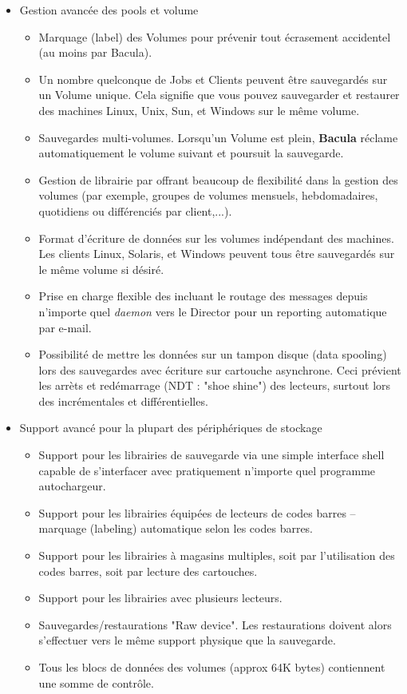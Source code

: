 \begin{itemize}
\item Gestion avanc\'ee des pools et volume 
  \begin{itemize}
    \item Marquage (label) des Volumes pour pr\'evenir tout \'ecrasement
    accidentel (au moins par Bacula).  
    \item Un nombre quelconque de Jobs et Clients peuvent \^etre sauvegard\'es sur
    un Volume unique.  Cela signifie que vous pouvez sauvegarder et restaurer des
    machines Linux,  Unix, Sun, et Windows sur le m\^eme volume.  
    \item Sauvegardes multi-volumes. Lorsqu'un Volume est plein, {\bf Bacula} 
    r\'eclame automatiquement le volume suivant et poursuit la sauvegarde.  
    \item Gestion de librairie par 
    offrant  beaucoup de
   flexibilit\'e dans la gestion des volumes (par exemple, groupes de volumes mensuels, 
   hebdomadaires, quotidiens ou diff\'erenci\'es par client,...).  
   \item Format d'\'ecriture de donn\'ees sur les volumes ind\'ependant des
   machines. Les clients  Linux, Solaris, et Windows peuvent tous \^etre
   sauvegard\'es sur le m\^eme volume si  d\'esir\'e.  
   \item Prise en charge flexible des 
     incluant le routage des
   messages depuis n'importe quel {\it daemon} vers le Director  pour un
   reporting automatique par e-mail.  
   \item Possibilit\'e de mettre les donn\'ees sur un tampon disque (data
   spooling) lors des sauvegardes avec \'ecriture sur cartouche 
   asynchrone. Ceci pr\'evient les arr\`ets et red\'emarrage (NDT : "shoe shine") des lecteurs, 
   surtout lors des incr\'ementales et diff\'erentielles. 
 \end{itemize}

\item Support avanc\'e pour la plupart des p\'eriph\'eriques de stockage 
 \begin{itemize}
   \item Support pour les librairies de sauvegarde via une simple interface shell
   capable de s'interfacer avec pratiquement n'importe quel programme
   autochargeur.  
   \item Support pour les librairies \'equip\'ees de lecteurs de codes barres --
   marquage (labeling)  automatique selon les codes barres.  
   \item Support pour les librairies \`a magasins multiples, soit par
   l'utilisation des codes barres,  soit par lecture des cartouches. 
   \item Support pour les librairies avec plusieurs lecteurs. 
   \item Sauvegardes/restaurations "Raw device". Les restaurations doivent
   alors s'effectuer vers  le m\^eme support physique que la sauvegarde.  
   \item Tous les blocs de donn\'ees des volumes (approx 64K bytes) contiennent
   une somme de contr\^ole.  
 \end{itemize}


\end{itemize}
